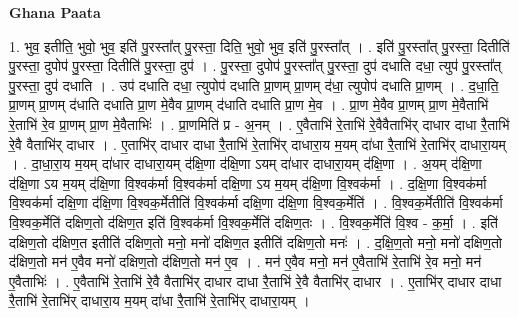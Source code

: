 \documentclass[17pt]{extarticle}
\begin{document}
\textbf{Ghana Paata } \newline

1. भुव॒ इतीति॒ भुवो॒ भुव॒ इति॑ पु॒रस्ता᳚त् पु॒रस्ता॒ दिति॒ भुवो॒ भुव॒ इति॑ पु॒रस्ता᳚त् । . इति॑ पु॒रस्ता᳚त् पु॒रस्ता॒ दितीति॑ पु॒रस्ता॒ दुपोप॑ पु॒रस्ता॒ दितीति॑ पु॒रस्ता॒ दुप॑ । . पु॒रस्ता॒ दुपोप॑ पु॒रस्ता᳚त् पु॒रस्ता॒ दुप॑ दधाति दधा॒ त्युप॑ पु॒रस्ता᳚त् पु॒रस्ता॒ दुप॑ दधाति । . उप॑ दधाति दधा॒ त्युपोप॑ दधाति प्रा॒णम् प्रा॒णम् द॑धा॒ त्युपोप॑ दधाति प्रा॒णम् । . द॒धा॒ति॒ प्रा॒णम् प्रा॒णम् द॑धाति दधाति प्रा॒ण मे॒वैव प्रा॒णम् द॑धाति दधाति प्रा॒ण मे॒व । . प्रा॒ण मे॒वैव प्रा॒णम् प्रा॒ण मे॒वैताभि॑ रे॒ताभि॑ रे॒व प्रा॒णम् प्रा॒ण मे॒वैताभिः॑ । . प्रा॒णमिति॑ प्र - अ॒नम् । . ए॒वैताभि॑ रे॒ताभि॑ रे॒वैवैताभि॑र् दाधार दाधा रै॒ताभि॑ रे॒वै वैताभि॑र् दाधार । . ए॒ताभि॑र् दाधार दाधा रै॒ताभि॑ रे॒ताभि॑र् दाधारा॒य म॒यम् दा॑धा रै॒ताभि॑ रे॒ताभि॑र् दाधारा॒यम् । . दा॒धा॒रा॒य म॒यम् दा॑धार दाधारा॒यम् द॑क्षि॒णा द॑क्षि॒णा ऽयम् दा॑धार दाधारा॒यम् द॑क्षि॒णा । . अ॒यम् द॑क्षि॒णा द॑क्षि॒णा ऽय म॒यम् द॑क्षि॒णा वि॒श्वक॑र्मा वि॒श्वक॑र्मा दक्षि॒णा ऽय म॒यम् द॑क्षि॒णा वि॒श्वक॑र्मा । . द॒क्षि॒णा वि॒श्वक॑र्मा वि॒श्वक॑र्मा दक्षि॒णा द॑क्षि॒णा वि॒श्वक॒र्मेतीति॑ वि॒श्वक॑र्मा दक्षि॒णा द॑क्षि॒णा वि॒श्वक॒र्मेति॑ । . वि॒श्वक॒र्मेतीति॑ वि॒श्वक॑र्मा वि॒श्वक॒र्मेति॑ दक्षिण॒तो द॑क्षिण॒त इति॑ वि॒श्वक॑र्मा वि॒श्वक॒र्मेति॑ दक्षिण॒तः । . वि॒श्वक॒र्मेति॑ वि॒श्व - क॒र्मा॒ । . इति॑ दक्षिण॒तो द॑क्षिण॒त इतीति॑ दक्षिण॒तो मनो॒ मनो॑ दक्षिण॒त इतीति॑ दक्षिण॒तो मनः॑ । . द॒क्षि॒ण॒तो मनो॒ मनो॑ दक्षिण॒तो द॑क्षिण॒तो मन॑ ए॒वैव मनो॑ दक्षिण॒तो द॑क्षिण॒तो मन॑ ए॒व । . मन॑ ए॒वैव मनो॒ मन॑ ए॒वैताभि॑ रे॒ताभि॑ रे॒व मनो॒ मन॑ ए॒वैताभिः॑ । . ए॒वैताभि॑ रे॒ताभि॑ रे॒वै वैताभि॑र् दाधार दाधा रै॒ताभि॑ रे॒वै वैताभि॑र् दाधार । . ए॒ताभि॑र् दाधार दाधा रै॒ताभि॑ रे॒ताभि॑र् दाधारा॒य म॒यम् दा॑धा रै॒ताभि॑ रे॒ताभि॑र् दाधारा॒यम् । \newline
\end{document}
